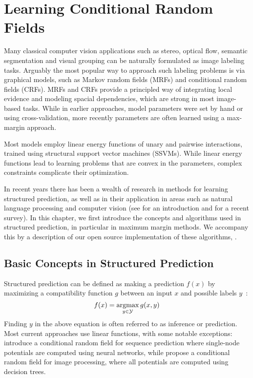 \chapter{Learning Conditional Random Fields}\label{ch:structured_pystruct}

Many classical computer vision applications such as stereo, optical flow, semantic
segmentation and visual grouping can be naturally formulated as image labeling tasks.
%
Arguably the most popular way to approach such labeling problems is via graphical
models, such as Markov random fields (MRFs) and conditional random fields (CRFs).
MRFs and CRFs provide a principled way of integrating local evidence and
modeling spacial dependencies, which are strong in most image-based tasks.
%
While in earlier approaches, model parameters were set by hand or using
cross-validation, more recently parameters are often learned using a max-margin
approach.

Most models employ linear energy functions of unary and pairwise interactions,
trained using structural support vector machines (SSVMs). While linear energy
functions lead to learning problems that are convex in the parameters, complex
constraints complicate their optimization.  %

In recent years there has been a wealth of research in methods for learning
structured prediction, as well as in their application in areas such as natural
language processing and computer vision (see \citet{nowozin2011structured}
for an introduction and \citet{blake2011markov} for a recent survey).
%
In this chapter, we first introduce the concepts and algorithms used in
structured prediction, in particular in maximum margin methods. We 
accompany this by a description of our open source implementation of these
algorithms, \pystruct.

\pagebreak %

\section{Basic Concepts in Structured Prediction}

Structured prediction can be defined as making a prediction $f(x)$ by
maximizing a compatibility function $g$ between an input $x$ and possible
labels
$y$~\citep{nowozin2011structured}:
\begin{equation}
    f(x) = \operatorname*{argmax}_{y \in \mathcal{Y}} g(x, y)
\end{equation}
Finding $y$ in the above equation is often referred to as inference
or prediction.
Most current approaches use linear functions, with some notable exceptions:
\citet{peng2009conditional} introduce a conditional random field for sequence
prediction where single-node potentials are computed using neural networks,
while \citet{nowozin2011decision} propose a conditional random field for image
processing, where all potentials are computed using decision trees.


